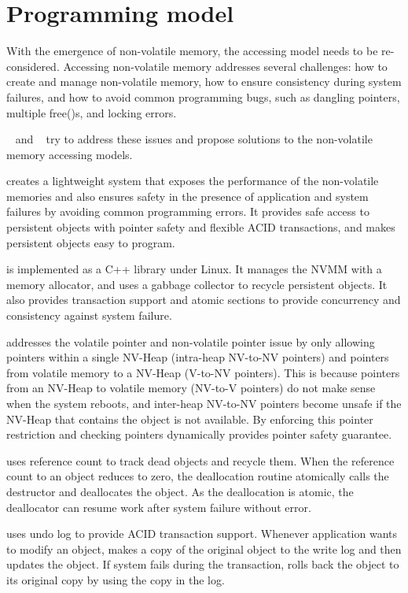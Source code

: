 \section{Programming model} 
\label{sec:access}

With the emergence of non-volatile memory, the accessing model needs
to be re-considered. Accessing non-volatile memory addresses several
challenges: how to create and manage non-volatile memory, how to ensure
consistency during system failures, and how to avoid common programming
bugs, such as dangling pointers, multiple free()s, and locking errors.

\textbf{\nvh{}}~\cite{nvheaps} and \textbf{\mnem{}}~\cite{mnemosyne}
try to address these issues
and propose solutions to the non-volatile memory accessing models.

\nvh{} creates a lightweight system that exposes the performance of the
non-volatile memories and also ensures safety in the presence of
application and system failures by avoiding common programming errors.
It provides safe access to persistent objects with pointer safety and
flexible ACID transactions, and makes persistent objects easy to program.

\nvh{} is implemented as a C++ library under Linux. It manages
the NVMM with a memory allocator, and uses a gabbage collector to recycle
persistent objects. It also provides transaction support and atomic sections 
to provide concurrency and consistency against system failure.

\nvh{} addresses the volatile pointer and non-volatile pointer issue by
only allowing pointers within a single NV-Heap (intra-heap NV-to-NV pointers)
and pointers from volatile memory to a NV-Heap (V-to-NV pointers). This is
because pointers from an NV-Heap to volatile memory (NV-to-V pointers) do
not make sense when the system reboots, and inter-heap NV-to-NV pointers become
unsafe if the NV-Heap that contains the object is not available. By enforcing
this pointer restriction and checking pointers dynamically \nvh{} provides
pointer safety guarantee.

\nvh{} uses reference count to track dead objects and recycle them. When 
the reference count to an object reduces to zero, the deallocation routine 
atomically calls the destructor and deallocates the object. As the deallocation
is atomic, the deallocator can resume work after system failure without error.

\nvh{} uses undo log to provide ACID transaction support. Whenever application
wants to modify an object, \nvh{} makes a copy of the original object to
the write log and then updates the object. If system fails during
the transaction, \nvh{} rolls back the object to its original copy by using
the copy in the log.

